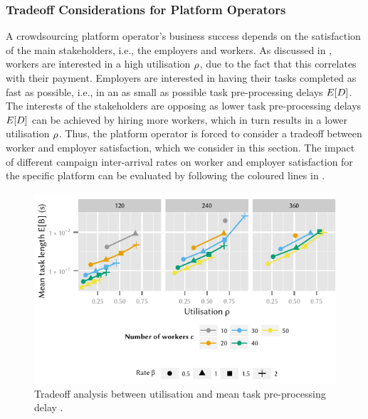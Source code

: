 \subsubsection*{Tradeoff Considerations for Platform Operators}

A crowdsourcing platform operator's business success depends on the satisfaction of the main stakeholders, i.e., the employers and workers.
As discussed in , workers are interested in a high utilisation \(\rho\), due to the fact that this correlates with their payment.
Employers are interested in having their tasks completed as fast as possible, i.e., in an as small as possible task pre-processing delays \(E[D]\).
The interests of the stakeholders are opposing as lower task pre-processing delays \(E[D]\) can be achieved by hiring more workers, which in turn results in a lower utilisation \(\rho\).
Thus, the platform operator is forced to consider a tradeoff between worker and employer satisfaction, which we consider in this section.
The impact of different campaign inter-arrival rates \campaignIAT on worker and employer satisfaction for the specific platform can be evaluated by following the coloured lines in .

\begin{figure}
	\centering
	\includegraphics{cloud/crowdsourcing/numerical_evaluation/figures/pareto}
	\caption{Tradeoff analysis between utilisation \workerUtilization and mean task pre-processing delay \preTaskProcessingDelay.}
	\label{fig:cloud:crowdsourcing:performance_evaluation:tradeoff:pareto}
\end{figure}

